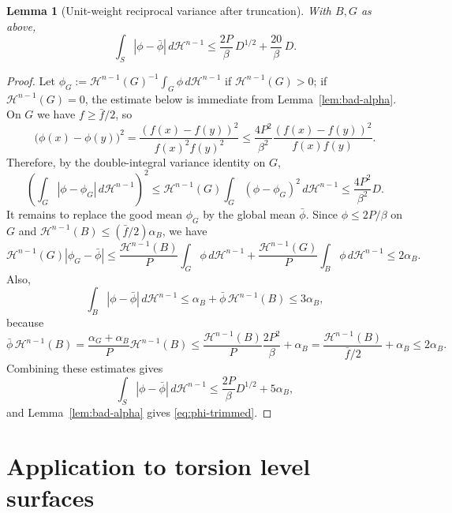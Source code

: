 \documentclass[11pt]{article}
\newtheorem{lemma}[theorem]{Lemma}
\theoremstyle{definition}
\newcommand{\Hn}{\mathcal H^{n-1}}
\begin{document}
\begin{lemma}[Unit-weight reciprocal variance after truncation]
\label{lem:trimmed-phi}
With $B,G$ as above,
\begin{equation}\label{eq:phi-trimmed}
   \int_S |\phi-\bar\phi|\,d\Hn
   \le \frac{2P}{\beta}\,D^{1/2}
       +\frac{20}{\beta}\,D .
\end{equation}
\end{lemma}

\begin{proof}
Let $\phi_G:=\Hn(G)^{-1}\int_G\phi\,d\Hn$ if $\Hn(G)>0$; if
$\Hn(G)=0$, the estimate below is immediate from Lemma~\ref{lem:bad-alpha}.
On $G$ we have $f\ge\bar f/2$, so
\[
   \bigl(\phi(x)-\phi(y)\bigr)^2
   =\frac{(f(x)-f(y))^2}{f(x)^2f(y)^2}
   \le\frac{4P^2}{\beta^2}
        \frac{(f(x)-f(y))^2}{f(x)f(y)} .
\]
Therefore, by the double-integral variance identity on $G$,
\[
   \left(\int_G|\phi-\phi_G|\,d\Hn\right)^2
   \le \Hn(G)\int_G(\phi-\phi_G)^2\,d\Hn
   \le \frac{4P^2}{\beta^2}D .
\]
It remains to replace the good mean $\phi_G$ by the global mean
$\bar\phi$.  Since $\phi\le2P/\beta$ on $G$ and
$\Hn(B)\le(\bar f/2)\alpha_B$, we have
\[
   \Hn(G)|\phi_G-\bar\phi|
   \le \frac{\Hn(B)}{P}\int_G\phi\,d\Hn
       +\frac{\Hn(G)}{P}\int_B\phi\,d\Hn
   \le 2\alpha_B .
\]
Also,
\[
   \int_B|\phi-\bar\phi|\,d\Hn
   \le \alpha_B+\bar\phi\,\Hn(B)
   \le 3\alpha_B,
\]
because
\[
   \bar\phi\,\Hn(B)
   =\frac{\alpha_G+\alpha_B}{P}\Hn(B)
   \le \frac{\Hn(B)}{P}\frac{2P^2}{\beta}+\alpha_B
   =\frac{\Hn(B)}{\bar f/2}+\alpha_B
   \le 2\alpha_B .
\]
Combining these estimates gives
\[
   \int_S|\phi-\bar\phi|\,d\Hn
   \le \frac{2P}{\beta}D^{1/2}+5\alpha_B,
\]
and Lemma~\ref{lem:bad-alpha} gives \eqref{eq:phi-trimmed}.
\end{proof}

\section{Application to torsion level surfaces}
\end{document}
